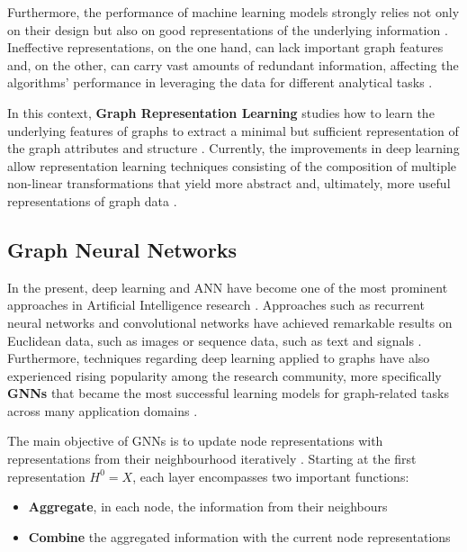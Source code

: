 \documentclass[11pt,a4paper]{article}
\begin{document}
Furthermore, the performance of machine learning models strongly relies not only on their design but also on good representations of the underlying information \cite{liuIntroductionGraphNeural2020}.  Ineffective representations, on the one hand, can lack important graph features and, on the other, can carry vast amounts of redundant information, affecting the algorithms' performance in leveraging the data for different analytical tasks \cite{liuIntroductionGraphNeural2020, wuGraphNeuralNetworks2022}. \par

In this context, \textbf{Graph Representation Learning} studies how to learn the underlying features of graphs to extract a minimal but sufficient representation of the graph attributes and structure \cite{hamiltonGraphRepresentationLearning, zhaoRepresentationLearning2022, cuiGraphRepresentationLearning2022}. Currently, the improvements in deep learning allow representation learning techniques consisting of the composition of multiple non-linear transformations that yield more abstract and, ultimately, more useful representations of graph data \cite{cuiGraphRepresentationLearning2022}. 

\subsection{Graph Neural Networks}

\begin{comment}
* GraphSAGE
\cite{scarselliGraphNeuralNetwork2009}
\end{comment}

In the present, deep learning and \ac{ANN} have become one of the most prominent approaches in Artificial Intelligence research \cite{cuiGraphRepresentationLearning2022}. Approaches such as recurrent neural networks and convolutional networks have achieved remarkable results on Euclidean data, such as images or sequence data, such as text and signals \cite{wuGraphNeuralNetworks2022a}. Furthermore, techniques regarding deep learning applied to graphs have also experienced rising popularity among the research community, more specifically \textbf{\acp{GNN}} that became the most successful learning models for graph-related tasks across many application domains \cite{cuiGraphRepresentationLearning2022, wuGraphNeuralNetworks2022a}. \par

The main objective of \acp{GNN} is to update node representations with representations from their neighbourhood iteratively \cite{tangGraphNeuralNetworks2022}. Starting at the first representation $H^0 = X$, each layer encompasses two important functions:
\begin{itemize}
    \item \textbf{Aggregate}, in each node, the information from their neighbours
    \item \textbf{Combine} the aggregated information with the current node representations
\end{itemize}
\end{document}
